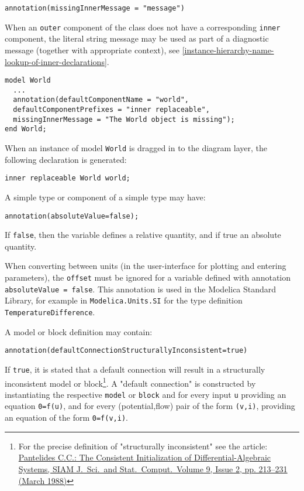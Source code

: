 \begin{lstlisting}[language=modelica]
annotation(missingInnerMessage = "message")
\end{lstlisting}

When an \lstinline!outer! component of the class does not have a corresponding \lstinline!inner!
component, the literal string message may be used as part of a diagnostic message (together with appropriate context), see
\cref{instance-hierarchy-name-lookup-of-inner-declarations}.

\begin{example}
\begin{lstlisting}[language=modelica]
model World
  ...
  annotation(defaultComponentName = "world",
  defaultComponentPrefixes = "inner replaceable",
  missingInnerMessage = "The World object is missing");
end World;
\end{lstlisting}
When an instance of model \lstinline!World! is dragged in to the diagram layer, the
following declaration is generated:
\begin{lstlisting}[language=modelica]
inner replaceable World world;
\end{lstlisting}
\end{example}

A simple type or component of a simple type may have:
\begin{lstlisting}[language=modelica]
annotation(absoluteValue=false);
\end{lstlisting}

If \lstinline!false!, then the variable defines a relative quantity, and if true an
absolute quantity.

\begin{nonnormative}
When converting between units (in the user-interface for plotting and entering parameters), the \lstinline!offset! must be
ignored for a variable defined with annotation \lstinline!absoluteValue = false!.
This annotation is used in the Modelica Standard Library, for example in
\lstinline!Modelica.Units.SI! for the type definition \lstinline!TemperatureDifference!.
\end{nonnormative}

A model or block definition may contain:
\begin{lstlisting}[language=modelica]
annotation(defaultConnectionStructurallyInconsistent=true)
\end{lstlisting}

If \lstinline!true!, it is stated that a default connection will result in a
structurally inconsistent model or block\footnote{For the precise
  definition of "structurally inconsistent" see the article:
  \href{http://epubs.siam.org/doi/abs/10.1137/0909014}{Pantelides C.C.:
  The Consistent Initialization of Differential-Algebraic Systems, SIAM
  J.\ Sci.\ and Stat.\ Comput.\ Volume 9, Issue 2, pp. 213--231 (March
  1988)}}. A "default connection" is constructed by instantiating the
respective \lstinline!model! or \lstinline!block! and for every input \lstinline!u! providing an equation
\lstinline!0=f(u)!, and for every (potential,flow) pair of the form \lstinline!(v,i)!, providing
an equation of the form \lstinline!0=f(v,i)!.

